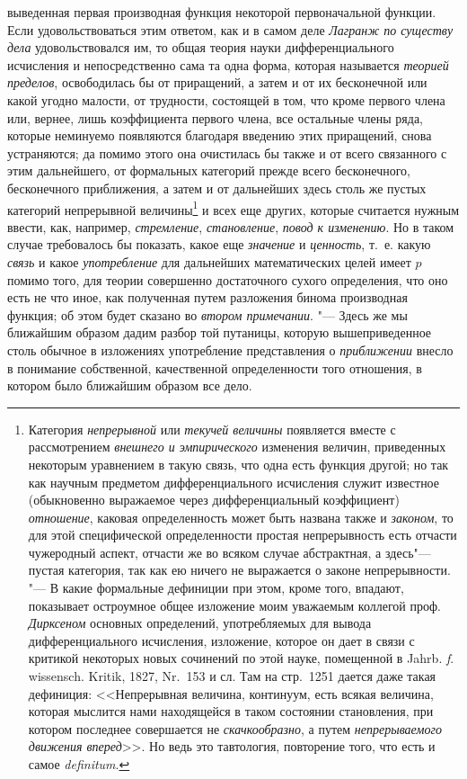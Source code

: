 выведенная первая производная функция некоторой первоначальной функции.
Если удовольствоваться этим ответом, как и в самом деле
{\em Лагранж по существу дела} удовольствовался им, то
общая теория науки дифференциального исчисления и непосредственно сама та
одна форма, которая называется {\em теорией пределов},
освободилась бы от приращений, а затем и от их бесконечной или какой угодно
малости, от трудности, состоящей в том, что кроме первого члена или,
вернее, лишь коэффициента первого члена, все остальные члены ряда, которые
неминуемо появляются благодаря введению этих приращений, снова устраняются;
да помимо этого она очистилась бы также и от всего связанного с этим
дальнейшего, от формальных категорий прежде всего бесконечного,
бесконечного приближения, а затем и от дальнейших здесь столь же пустых
категорий непрерывной величины\footnote{Категория
{\em непрерывной} или {\em текучей величины} появляется вместе с рассмотрением
{\em внешнего и эмпирического} изменения величин,
приведенных некоторым уравнением в такую
связь, что одна есть функция другой; но так как научным предметом
дифференциального исчисления служит известное (обыкновенно выражаемое через
дифференциальный коэффициент) {\em отношение}, каковая
определенность может быть названа также и {\em законом}, то для
этой специфической определенности простая непрерывность есть отчасти
чужеродный аспект, отчасти же во всяком случае абстрактная, а здесь"--- пустая
категория, так как ею ничего не выражается о законе непрерывности. "---
В какие формальные дефиниции при этом, кроме того, впадают,
показывает остроумное общее изложение моим уважаемым коллегой проф.
{\em Дирксеном} основных
определений, употребляемых для вывода дифференциального исчисления,
изложение, которое он дает в связи с критикой некоторых новых сочинений по
этой науке, помещенной в Jahrb. {\em f}.
wissensch. Kritik, 1827, Nr.~153 и сл. Там на стр.~1251
дается даже такая дефиниция: <<Непрерывная величина, континуум, есть всякая
величина, которая мыслится нами находящейся в таком состоянии становления,
при котором последнее совершается не
{\em скачкообразно}, а путем {\em непрерываемого движения
вперед}>>. Но ведь это тавтология, повторение того, что есть
и самое {\em definitum}.} и всех еще других, которые
считается нужным ввести, как, например,
{\em стремление}, {\em становление}, {\em повод к изменению}.
Но в таком случае требовалось бы показать, какое еще
{\em значение} и {\em ценность}, т.~е. какую {\em связь} и какое
{\em употребление} для дальнейших математических целей
имеет $p$ помимо того, для теории совершенно
достаточного сухого определения, что оно есть не что иное, как полученная
путем разложения бинома производная функция; об этом будет сказано во
{\em втором примечании}. "--- Здесь же мы ближайшим
образом дадим разбор той путаницы, которую вышеприведенное столь обычное в
изложениях употребление представления о
{\em приближении} внесло в понимание собственной,
качественной определенности того отношения, в котором было ближайшим
образом все дело.

